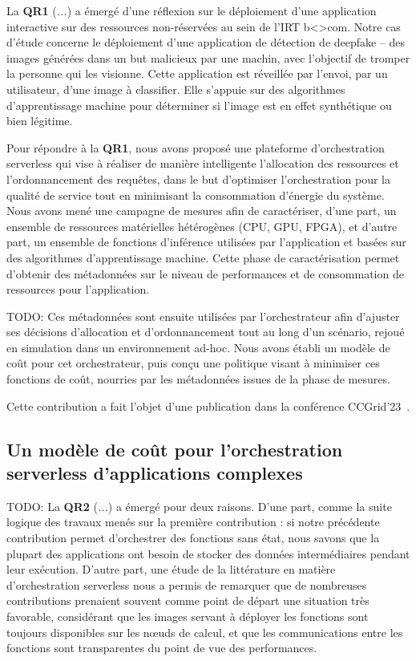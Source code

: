 La \textbf{QR1} (\textit{...}) a émergé d'une réflexion sur le déploiement d'une application interactive sur des ressources non-réservées au sein de l'IRT b{\textless\textgreater}com. Notre cas d'étude concerne le déploiement d'une application de détection de deepfake -- des images générées dans un but malicieux par une machin, avec l'objectif de tromper la personne qui les visionne. Cette application est réveillée par l'envoi, par un utilisateur, d'une image à classifier. Elle s'appuie sur des algorithmes d'apprentissage machine pour déterminer si l'image est en effet synthétique ou bien légitime.

Pour répondre à la \textbf{QR1}, nous avons proposé une plateforme d'orchestration serverless qui vise à réaliser de manière intelligente l'allocation des ressources et l'ordonnancement des requêtes, dans le but d'optimiser l'orchestration pour la qualité de service tout en minimisant la consommation d'énergie du système. Nous avons mené une campagne de mesures afin de caractériser, d'une part, un ensemble de ressources matérielles hétérogènes (CPU, GPU, FPGA), et d'autre part, un ensemble de fonctions d'inférence utilisées par l'application et basées sur des algorithmes d'apprentissage machine. Cette phase de caractérisation permet d'obtenir des métadonnées sur le niveau de performances et de consommation de ressources pour l'application.

TODO: Ces métadonnées sont ensuite utilisées par l'orchestrateur afin d'ajuster ses décisions d'allocation et d'ordonnancement tout au long d'un scénario, rejoué en simulation dans un environnement ad-hoc. Nous avons établi un modèle de coût pour cet orchestrateur, puis conçu une politique visant à minimiser ces fonctions de coût, nourries par les métadonnées issues de la phase de mesures.

Cette contribution a fait l'objet d'une publication dans la conférence CCGrid'23~\cite{herofake}.

\subsection{Un modèle de coût pour l'orchestration serverless d'applications complexes}

TODO: La \textbf{QR2} (\textit{...}) a émergé pour deux raisons. D'une part, comme la suite logique des travaux menés sur la première contribution : si notre précédente contribution permet d'orchestrer des fonctions sans état, nous savons que la plupart des applications ont besoin de stocker des données intermédiaires pendant leur exécution. D'autre part, une étude de la littérature en matière d'orchestration serverless nous a permis de remarquer que de nombreuses contributions prenaient souvent comme point de départ une situation très favorable, considérant que les images servant à déployer les fonctions sont toujours disponibles sur les nœuds de calcul, et que les communications entre les fonctions sont transparentes du point de vue des performances.

